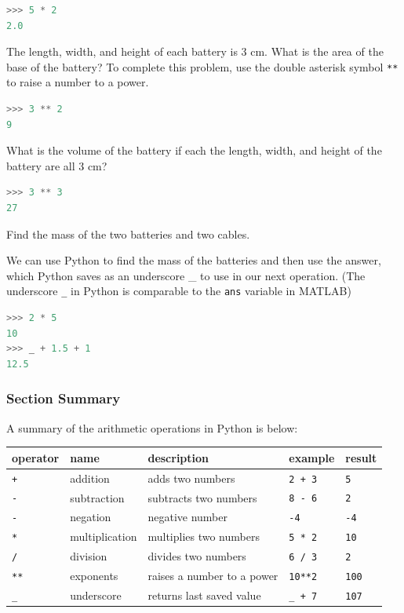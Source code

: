 \documentclass{book}
\begin{document}
\begin{lstlisting}[language=Python]
>>> 5 * 2
2.0
\end{lstlisting}

The length, width, and height of each battery is 3 cm. What is the area
of the base of the battery? To complete this problem, use the double
asterisk symbol \lstinline!**! to raise a number to a power.

\begin{lstlisting}[language=Python]
>>> 3 ** 2
9
\end{lstlisting}

What is the volume of the battery if each the length, width, and height
of the battery are all 3 cm?

\begin{lstlisting}[language=Python]
>>> 3 ** 3
27
\end{lstlisting}

Find the mass of the two batteries and two cables.

We can use Python to find the mass of the batteries and then use the
answer, which Python saves as an underscore \_ to use in our next
operation. (The underscore \lstinline!_! in Python is comparable to the
\lstinline!ans! variable in MATLAB)

\begin{lstlisting}[language=Python]
>>> 2 * 5 
10
>>> _ + 1.5 + 1
12.5
\end{lstlisting}
    




    
        \subsubsection{Section Summary}\label{section-summary}

A summary of the arithmetic operations in Python is below:

\begin{longtable}[]{@{}lllll@{}}
\toprule
operator & name & description & example & result\tabularnewline
\midrule
\endhead
\lstinline!+! & addition & adds two numbers & \lstinline!2 + 3! &
\lstinline!5!\tabularnewline
\lstinline!-! & subtraction & subtracts two numbers & \lstinline!8 - 6!
& \lstinline!2!\tabularnewline
\lstinline!-! & negation & negative number & \lstinline!-4! &
\lstinline!-4!\tabularnewline
\lstinline!*! & multiplication & multiplies two numbers &
\lstinline!5 * 2! & \lstinline!10!\tabularnewline
\lstinline!/! & division & divides two numbers & \lstinline!6 / 3! &
\lstinline!2!\tabularnewline
\lstinline!**! & exponents & raises a number to a power &
\lstinline!10**2! & \lstinline!100!\tabularnewline
\lstinline!_! & underscore & returns last saved value &
\lstinline!_ + 7! & \lstinline!107!\tabularnewline
\bottomrule
\end{longtable}
    
\end{document}
